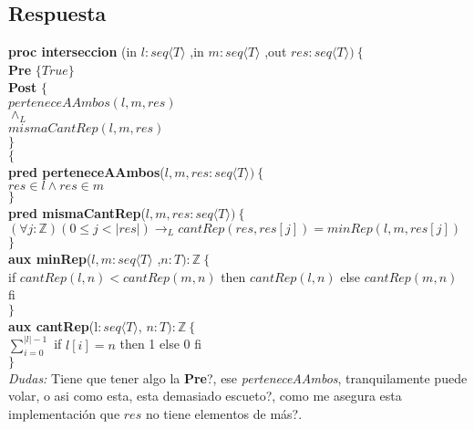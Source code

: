 \documentclass[a4paper]{article}
\begin{document}
\subsection*{Respuesta}

			\textbf{proc interseccion }(in $l:seq\langle T\rangle$
				,in $m:seq\langle T\rangle$
				,out $res:seq\langle T\rangle )\ \{$\smallskip \\
			\hspace*{6mm} \textbf{Pre }$\{ True\}$\smallskip \\
			\hspace*{6mm} \textbf{Post }$\{$\\
			\hspace*{6mm} $perteneceAAmbos(l,m,res)$\\
			\hspace*{6mm} $\wedge_L$\\
			\hspace*{6mm} $mismaCantRep(l,m,res)$\\
			\hspace*{6mm} $\}$\\
			$\{$\smallskip \\
			
			\textbf{pred perteneceAAmbos}($l,m,res:seq\langle T\rangle)
			\ \{$\smallskip \\
			\hspace*{6mm}$ res \in l \wedge res \in m$\\
			$\}$\smallskip \\	
			
			\textbf{pred mismaCantRep}($l,m,res:seq\langle T\rangle)
			\ \{$\smallskip \\
			\hspace*{6mm}$(\forall j:\mathbb{Z})(0\leq j<|res|)\rightarrow_L
			cantRep(res,res[j])=minRep(l,m,res[j])$\\
			$\}$\smallskip \\	
			
			\textbf{aux minRep}($l,m:seq\langle T\rangle$
				,$n:T ):\mathbb{Z}\ \{$\smallskip \\
			\hspace*{6mm}if $cantRep(l,n)<cantRep(m,n)$
				 then $cantRep(l,n)$ else $cantRep(m,n)$ fi\\
			$\}$\smallskip \\			
			
			\textbf{aux cantRep}(l$: seq\langle T\rangle$, $n:T):\mathbb{Z}
			\ \{$\smallskip \\
			\hspace*{6mm}$\sum_{i=0}^{|l|-1}$ if $l[i]=n$ then 1 else 0 fi\\
			$\}$\smallskip \\	
\textit{Dudas:} Tiene que tener algo la \textbf{Pre}?, ese \textit{perteneceAAmbos},
 tranquilamente puede volar, o asi como esta, esta demasiado escueto?, como me asegura esta implementación que $res$ no tiene elementos de
 más?.
\end{document}
